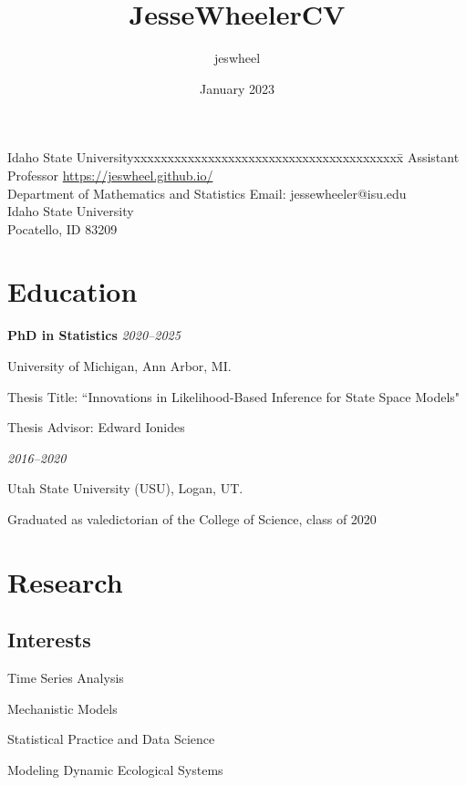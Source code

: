 \documentclass[11pt]{article}
\title{JesseWheelerCV}
\author{jeswheel}
\date{January 2023}
\newenvironment {interests}
                {
                 \begin{list}{}
                 {\setlength{\labelwidth}{0mm}
                  \setlength{\leftmargin}{8mm}
                  \setlength{\itemindent}{-3mm}
                  \setlength{\labelsep}{0mm}
                  \setlength{\parsep}{0.1 ex}
                  \setlength{\itemsep}{1pt}
      \setlength{\topsep}{0.15cm}}} %
   {\end{list}}
\begin{document}
\thispagestyle{empty}  %

\rule{0mm}{1mm}
\vspace{-20mm}


\vspace{1mm}

\rule{0mm}{1mm}


\begin{tabbing}
Idaho State Universityxxxxxxxxxxxxxxxxxxxxxxxxxxxxxxxxxxxxxxxx\= \kill
Assistant Professor \>
{\url{https://jeswheel.github.io/}}\\
Department of Mathematics and Statistics \>  %
Email: {jessewheeler@isu.edu}
\\
Idaho State University\> %
\\
Pocatello, ID 83209 \>
\end{tabbing}

\section*{Education}

{\bf PhD in Statistics} \hfill {\textit{2020--2025}}

University of Michigan, Ann Arbor, MI.

Thesis Title: ``Innovations in Likelihood-Based Inference for State Space Models"

Thesis Advisor: Edward Ionides

\vspace{2mm}

 \hfill  {\textit{2016--2020}}

Utah State University (USU), Logan, UT.

Graduated as valedictorian of the College of Science, class of 2020

\section*{Research}
\subsection*{Interests}
\begin{interests}
    \item Time Series Analysis
    \item Mechanistic Models
    \item Statistical Practice and Data Science
    \item Modeling Dynamic Ecological Systems

\end{interests}
\end{document}
